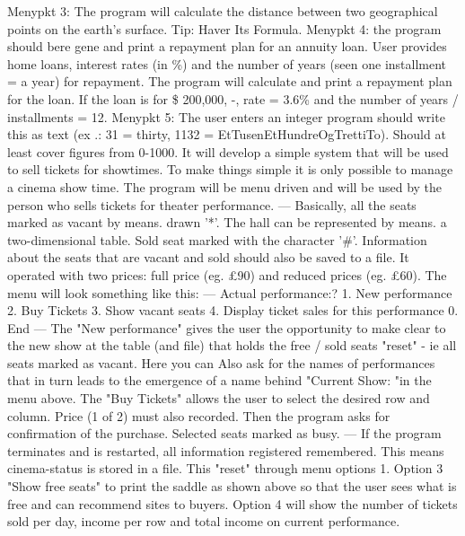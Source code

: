 Menypkt 3: The program will calculate the distance between two geographical points on the earth's surface. 
Tip: Haver Its Formula.
Menypkt 4: the program should bere gene and print a repayment plan for an annuity loan. 
User provides home loans, interest rates (in \%) and the number of years (seen one installment = a year) for repayment. 
The program will calculate and print a repayment plan for the loan. 
If the loan is for \$ 200,000, -, rate = 3.6\% and the number of years / installments = 12.
Menypkt 5: The user enters an integer program should write this as text (ex .: 31 = thirty, 1132 = EtTusenEtHundreOgTrettiTo). 
Should at least cover figures from 0-1000.
\vspace{0.5em}\newline
It will develop a simple system that will be used to sell tickets for showtimes.
To make things simple it is only possible to manage a cinema show time.
The program will be menu driven and will be used by the person who sells tickets for theater performance.
---
Basically, all the seats marked as vacant by means. drawn '*'.
The hall can be represented by means. a two-dimensional table. Sold seat marked with the character '\#'.
Information about the seats that are vacant and sold should also be saved to a file.
It operated with two prices: full price (eg. £90) and reduced prices (eg. £60).
The menu will look something like this:
---
Actual performance:?
1. New performance
2. Buy Tickets
3. Show vacant seats
4. Display ticket sales for this performance
0. End
---
The "New performance" gives the user the opportunity to make clear to the new show at the table (and file) that holds the free / sold seats "reset" - ie all seats marked as vacant. 
Here you can Also ask for the names of performances that in turn leads to the emergence of a name behind "Current Show: "in the menu above.
The "Buy Tickets" allows the user to select the desired row and column. 
Price (1 of 2) must also recorded. 
Then the program asks for confirmation of the purchase. 
Selected seats marked as busy.
---
If the program terminates and is restarted, all information registered remembered. 
This means cinema-status is stored in a file. This "reset" through menu options 1.
Option 3 "Show free seats" to print the saddle as shown above so that the user sees what is free and can recommend sites to buyers.
Option 4 will show the number of tickets sold per day, income per row and total income on current performance.
\vspace{0.5em}\newline
